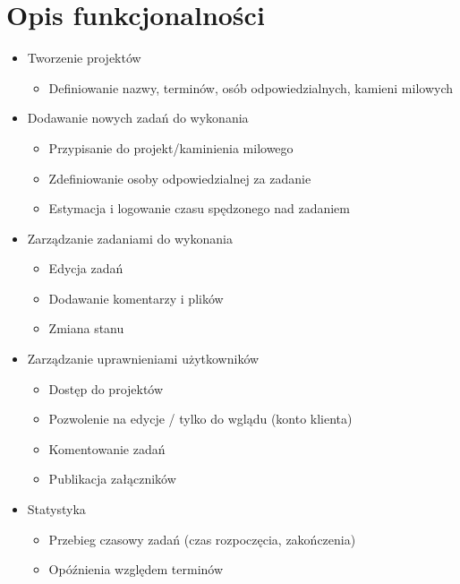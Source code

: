 \documentclass[wide,a4paper,titlepage,12pt] {article}
\begin{document}
\section{Opis funkcjonalności}
  \begin{itemize}
    \item Tworzenie projektów
      \begin{itemize}
        \item Definiowanie nazwy, terminów, osób odpowiedzialnych, kamieni milowych
      \end{itemize}

    \item Dodawanie nowych zadań do wykonania
      \begin{itemize}
        \item Przypisanie do projekt/kaminienia milowego
        \item Zdefiniowanie osoby odpowiedzialnej za zadanie
        \item Estymacja i logowanie czasu spędzonego nad zadaniem
      \end{itemize}

   \item Zarządzanie zadaniami do wykonania
     \begin{itemize}
       \item Edycja zadań
       \item Dodawanie komentarzy i plików
       \item Zmiana stanu
     \end{itemize}

    \item Zarządzanie uprawnieniami użytkowników
      \begin{itemize}
        \item Dostęp do projektów
        \item Pozwolenie na edycje / tylko do wglądu (konto klienta)
        \item Komentowanie zadań
        \item Publikacja załączników
      \end{itemize}

    \item Statystyka
      \begin{itemize}
        \item Przebieg czasowy zadań (czas rozpoczęcia, zakończenia)
        \item Opóźnienia względem terminów
      \end{itemize}

  \end{itemize}
\end{document}

